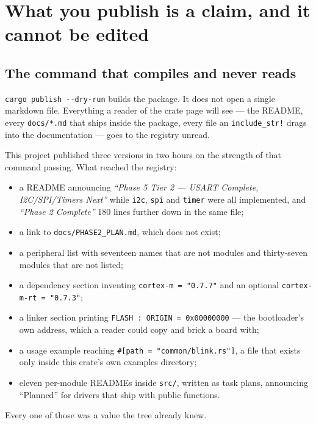 \section{What you publish is a claim, and it cannot be edited}
\label{sec:publishing-is-a-claim}

\subsection{The command that compiles and never reads}

\texttt{cargo publish -{}-dry-run} builds the package. It does not open a single markdown file. Everything a reader of
the crate page will see --- the README, every \texttt{docs/*.md} that ships inside the package, every file an
\texttt{include\_str!} drags into the documentation --- goes to the registry unread.

This project published three versions in two hours on the strength of that command passing. What reached the registry:

\begin{itemize}
  \item a README announcing \emph{``Phase 5 Tier 2 --- USART Complete, I2C/SPI/Timers Next''} while
        \texttt{i2c}, \texttt{spi} and \texttt{timer} were all implemented, and \emph{``Phase 2 Complete''} 180 lines
        further down in the same file;
  \item a link to \texttt{docs/PHASE2\_PLAN.md}, which does not exist;
  \item a peripheral list with seventeen names that are not modules and thirty-seven modules that are not listed;
  \item a dependency section inventing \texttt{cortex-m = "0.7.7"} and an optional \texttt{cortex-m-rt = "0.7.3"};
  \item a linker section printing \texttt{FLASH : ORIGIN = 0x00000000} --- the bootloader's own address, which a reader
        could copy and brick a board with;
  \item a usage example reaching \texttt{\#[path = "common/blink.rs"]}, a file that exists only inside this crate's own
        examples directory;
  \item eleven per-module READMEs inside \texttt{src/}, written as task plans, announcing ``Planned'' for drivers that
        ship with public functions.
\end{itemize}

Every one of those was a value the tree already knew.


